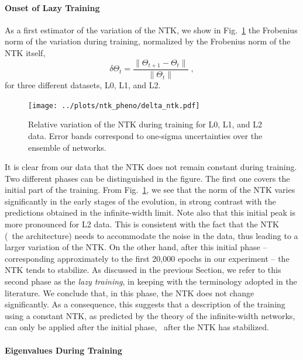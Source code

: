 \paragraph{Onset of Lazy Training} 

As a first estimator of the variation of the NTK, we show in
Fig.~\ref{fig:NTKTime} the Frobenius norm of the variation during training,
normalized by the Frobenius norm of the NTK itself, 
\begin{equation}
\delta \Theta_t = \frac{\lVert \Theta_{t+1} - \Theta_t \rVert}{\lVert \Theta_t \rVert} \;,
\label{eq:DeltaNTK}
\end{equation}
for three different datasets, L0, L1, and L2. 

\begin{figure}[ht!]
  \centering
  \texttt{[image: ../plots/ntk\_pheno/delta\_ntk.pdf]}
  \caption{Relative variation of the NTK during training for L0, L1, and L2
  data. Error bands correspond to one-sigma uncertainties over the ensemble of
  networks.}
  \label{fig:NTKTime}
\end{figure}

It is clear from our data that the NTK does not remain constant during training.
Two different phases can be distinguished in the figure. The first one covers
the initial part of the training. From Fig.~\ref{fig:NTKTime}, we see that the
norm of the NTK varies significantly in the early stages of the evolution, in
strong contrast with the predictions obtained in the infinite-width limit. Note
also that this initial peak is more pronounced for L2 data. This is consistent
with the fact that the NTK (\ie\ the architecture) needs to accommodate the
noise in the data, thus leading to a larger variation of the NTK. On the other
hand, after this initial phase -- corresponding approximately to the first
20,000 epochs in our experiment -- the NTK tends to stabilize. As discussed in
the previous Section, we refer to this second phase as the \textit{lazy
training}, in keeping with the terminology adopted in the literature. We
conclude that, in this phase, the NTK does not change significantly. As a
consequence, this suggests that a description of the training using a constant
NTK, as predicted by the theory of the infinite-width networks, can only be
applied after the initial phase, \ie\ after the NTK has stabilized. 

\FloatBarrier

\paragraph{Eigenvalues During Training}

